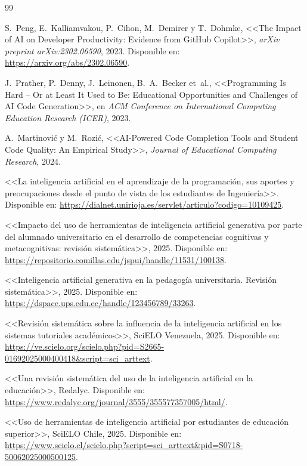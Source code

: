 \documentclass[12pt,a4paper,oneside]{report}
\begin{document}
\begin{thebibliography}{99}

S.~Peng, E.~Kalliamvakou, P.~Cihon, M.~Demirer y T.~Dohmke, <<The Impact of AI on Developer Productivity: Evidence from GitHub Copilot>>, \textit{arXiv preprint arXiv:2302.06590}, 2023. Disponible en: \url{https://arxiv.org/abs/2302.06590}.

J.~Prather, P.~Denny, J.~Leinonen, B.~A.~Becker et~al., <<Programming Is Hard -- Or at Least It Used to Be: Educational Opportunities and Challenges of AI Code Generation>>, en \textit{ACM Conference on International Computing Education Research (ICER)}, 2023.

A.~Martinović y M.~Rozić, <<AI-Powered Code Completion Tools and Student Code Quality: An Empirical Study>>, \textit{Journal of Educational Computing Research}, 2024.

<<La inteligencia artificial en el aprendizaje de la programación, sus aportes y preocupaciones desde el punto de vista de los estudiantes de Ingeniería>>. Disponible en: \url{https://dialnet.unirioja.es/servlet/articulo?codigo=10109425}.

<<Impacto del uso de herramientas de inteligencia artificial generativa por parte del alumnado universitario en el desarrollo de competencias cognitivas y metacognitivas: revisión sistemática>>, 2025. Disponible en: \url{https://repositorio.comillas.edu/jspui/handle/11531/100138}.

<<Inteligencia artificial generativa en la pedagogía universitaria. Revisión sistemática>>, 2025. Disponible en: \url{https://dspace.ups.edu.ec/handle/123456789/33263}.

<<Revisión sistemática sobre la influencia de la inteligencia artificial en los sistemas tutoriales académicos>>, SciELO Venezuela, 2025. Disponible en: \url{https://ve.scielo.org/scielo.php?pid=S2665-01692025000400418&script=sci_arttext}.

<<Una revisión sistemática del uso de la inteligencia artificial en la educación>>, Redalyc. Disponible en: \url{https://www.redalyc.org/journal/3555/355577357005/html/}.

<<Uso de herramientas de inteligencia artificial por estudiantes de educación superior>>, SciELO Chile, 2025. Disponible en: \url{https://www.scielo.cl/scielo.php?script=sci_arttext&pid=S0718-50062025000500125}.


\end{thebibliography}
\end{document}
